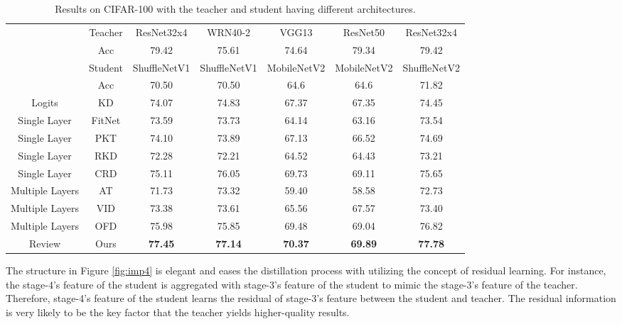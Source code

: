 \documentclass[final]{cvpr}
\begin{document}
\begin{table*}[tb]
	\centering
	\begin{tabular}{c c  c  c  c  c  c }
		\toprule
		 & Teacher & ResNet32x4  & WRN40-2     & VGG13       & ResNet50   & ResNet32x4   \\
		&Acc     & 79.42       & 75.61       & 74.64       & 79.34      & 79.42        \\ 
		&Student &ShuffleNetV1 &ShuffleNetV1 &MobileNetV2  &MobileNetV2 &ShuffleNetV2  \\
		&Acc     & 70.50       & 70.50       & 64.6        & 64.6       & 71.82        \\
		\midrule
		Logits & KD \cite{kd}      & 74.07       & 74.83       & 67.37       & 67.35      & 74.45        \\
		\midrule
		Single Layer &FitNet \cite{fitnet}  & 73.59       & 73.73       & 64.14       & 63.16      & 73.54        \\
		Single Layer &PKT \cite{pkt}     & 74.10        & 73.89       & 67.13       & 66.52      & 74.69        \\
		Single Layer &RKD \cite{rkd}     & 72.28       & 72.21       & 64.52       & 64.43      & 73.21        \\
		Single Layer &CRD \cite{crd}     & 75.11       & 76.05       & 69.73       & 69.11      & 75.65        \\
		\midrule
		Multiple Layers &AT \cite{at}      & 71.73       & 73.32       & 59.40       & 58.58      & 72.73        \\
		Multiple Layers&VID \cite{vid}      & 73.38       & 73.61       & 65.56       & 67.57      & 73.40        \\
		Multiple Layers&OFD \cite{ofd}     & 75.98       & 75.85       & 69.48       & 69.04      & 76.82        \\
		\midrule
		\midrule
		Review &Ours&\textbf{77.45}&\textbf{77.14}&\textbf{70.37}&\textbf{69.89}&\textbf{77.78}\\
		\bottomrule
	\end{tabular}
	\vspace{0.1in}
	\caption{Results on CIFAR-100 with the teacher and student having different architectures.}
	\label{tab:c100d}
\end{table*}




The structure in Figure \ref{fig:imp4} is elegant and eases the distillation process with utilizing the concept of residual learning. 
For instance, the stage-4's feature of the student is aggregated with stage-3's feature of the student to mimic the stage-3's feature of the teacher. Therefore, stage-4's feature of the student learns the residual of stage-3's feature between the student and teacher. The residual information is very likely to be the key factor that the teacher yields higher-quality results.
\end{document}
